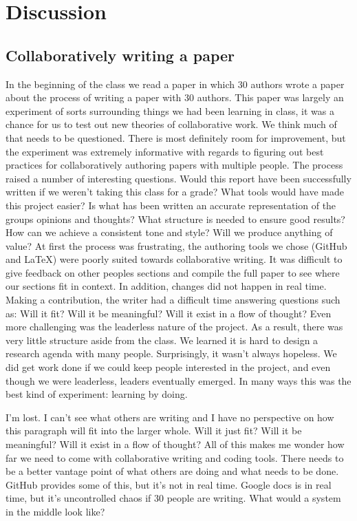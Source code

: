 \section{Discussion}
\subsection{Collaboratively writing a paper}
In the beginning of the class we read a paper \cite{tomlinson2012} in which 30 authors wrote a paper about the process of writing a paper with 30 authors. This paper was largely an experiment of sorts surrounding things we had been learning in class, it was a chance for us to test out new theories of collaborative work.
We think much of that needs to be questioned. There is most definitely room for improvement, but the experiment was extremely informative with regards to figuring out best practices for collaboratively authoring papers with multiple people.  
The process raised a number of interesting questions.
Would this report have been successfully written if we weren't taking this class for a grade?
What tools would have made this project easier? 
Is what has been written an accurate representation of the groups opinions and thoughts? 
What structure is needed to ensure good results?
How can we achieve a consistent tone and style? 
Will we produce anything of value?
At first the process was frustrating, the authoring tools we chose (GitHub and LaTeX) were poorly suited towards collaborative writing. It was difficult to give feedback on other peoples sections and compile the full paper to see where our sections fit in context. In addition, changes did not happen in real time. Making a contribution, the writer had a difficult time answering questions such as: Will it fit? Will it be meaningful? Will it exist in a flow of thought?
Even more challenging was the leaderless nature of the project. As a result, there was very little structure aside from the class. We learned it is hard to design a research agenda with many people. 
Surprisingly, it wasn't always hopeless. We did get work done if we could keep people interested in the project, and even though we were leaderless, leaders eventually emerged. In many ways this was the best kind of experiment: learning by doing.  


I'm lost. I can't see what others are writing and I have no perspective on how this paragraph will fit into the larger whole. Will it just fit? Will it be meaningful? Will it exist in a flow of thought? All of this makes me wonder how far we need to come with collaborative writing and coding tools. There needs to be a better vantage point of what others are doing and what needs to be done. GitHub provides some of this, but it's not in real time. Google docs is in real time, but it's uncontrolled chaos if 30 people are writing. What would a system in the middle look like?

